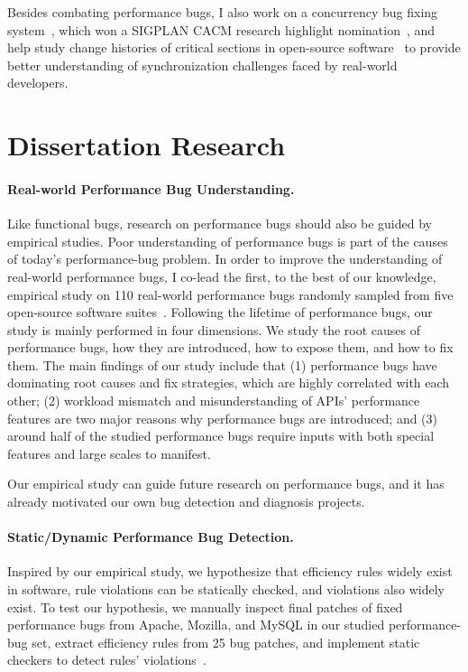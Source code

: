 \documentclass[10pt]{article}
\begin{document}
Besides combating performance bugs, 
I also work on a concurrency bug fixing system~\cite{jin11afix}, 
which won a SIGPLAN CACM research highlight nomination~\cite{afixnom}, 
and help study change histories of critical sections in open-source software~\cite{Gu15FSE} 
to provide better understanding of synchronization challenges faced by real-world developers.



\section{Dissertation Research}

\paragraph{Real-world Performance Bug Understanding.}
Like functional bugs, research on performance bugs should also be guided by empirical studies. 
Poor understanding of performance bugs is part of the causes of today's performance-bug problem. 
In order to improve the understanding of real-world performance bugs, 
I co-lead the first, to the best of our knowledge, 
empirical study on 110 real-world performance bugs randomly sampled from five open-source software suites~\cite{jin12perfbug}. 
Following the lifetime of performance bugs, 
our study is mainly performed in four dimensions. 
We study the root causes of performance bugs, 
how they are introduced, how to expose them, and how to fix them. 
The main findings of our study include that 
(1) performance bugs have dominating root causes and fix strategies, which are highly correlated with each other; 
(2) workload mismatch and misunderstanding of APIs’ performance features are two major reasons why performance bugs are introduced; 
and (3) around half of the studied performance bugs require inputs with both special features and large scales to manifest. 

Our empirical study can guide future research on performance bugs, 
and it has already motivated our own bug detection and diagnosis projects.

\paragraph{Static/Dynamic Performance Bug Detection.}

Inspired by our empirical study, we hypothesize that 
efficiency rules widely exist in software, 
rule violations can be statically checked, 
and violations also widely exist. 
To test our hypothesis, we manually inspect final patches of fixed performance bugs from Apache, Mozilla, and MySQL in our studied performance-bug set, 
extract efficiency rules from 25 bug patches, 
and implement static checkers to detect rules' violations~\cite{jin12perfbug}. 
\end{document}
